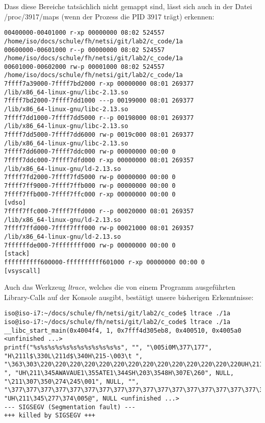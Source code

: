 \documentclass[a4paper,11pt,parskip=half]{scrartcl}
\begin{document}
Dass diese Bereiche tatsächlich nicht gemappt sind, lässt sich auch in der Datei /proc/3917/maps (wenn der Prozess die PID 3917 trägt) erkennen:
\begin{lstlisting}
00400000-00401000 r-xp 00000000 08:02 524557                             /home/iso/docs/schule/fh/netsi/git/lab2/c_code/1a
00600000-00601000 r--p 00000000 08:02 524557                             /home/iso/docs/schule/fh/netsi/git/lab2/c_code/1a
00601000-00602000 rw-p 00001000 08:02 524557                             /home/iso/docs/schule/fh/netsi/git/lab2/c_code/1a
7ffff7a39000-7ffff7bd2000 r-xp 00000000 08:01 269377                     /lib/x86_64-linux-gnu/libc-2.13.so
7ffff7bd2000-7ffff7dd1000 ---p 00199000 08:01 269377                     /lib/x86_64-linux-gnu/libc-2.13.so
7ffff7dd1000-7ffff7dd5000 r--p 00198000 08:01 269377                     /lib/x86_64-linux-gnu/libc-2.13.so
7ffff7dd5000-7ffff7dd6000 rw-p 0019c000 08:01 269377                     /lib/x86_64-linux-gnu/libc-2.13.so
7ffff7dd6000-7ffff7ddc000 rw-p 00000000 00:00 0 
7ffff7ddc000-7ffff7dfd000 r-xp 00000000 08:01 269357                     /lib/x86_64-linux-gnu/ld-2.13.so
7ffff7fd2000-7ffff7fd5000 rw-p 00000000 00:00 0 
7ffff7ff9000-7ffff7ffb000 rw-p 00000000 00:00 0 
7ffff7ffb000-7ffff7ffc000 r-xp 00000000 00:00 0                          [vdso]
7ffff7ffc000-7ffff7ffd000 r--p 00020000 08:01 269357                     /lib/x86_64-linux-gnu/ld-2.13.so
7ffff7ffd000-7ffff7fff000 rw-p 00021000 08:01 269357                     /lib/x86_64-linux-gnu/ld-2.13.so
7ffffffde000-7ffffffff000 rw-p 00000000 00:00 0                          [stack]
ffffffffff600000-ffffffffff601000 r-xp 00000000 00:00 0                  [vsyscall]
\end{lstlisting}

Auch das Werkzeug \emph{ltrace}, welches die von einem Programm ausgeführten Library-Calls auf der Konsole ausgibt, bestätigt unsere bisherigen Erkenntnisse:
\begin{lstlisting}
iso@iso-i7:~/docs/schule/fh/netsi/git/lab2/c_code$ ltrace ./1a
iso@iso-i7:~/docs/schule/fh/netsi/git/lab2/c_code$ ltrace ./1a
__libc_start_main(0x4004f4, 1, 0x7fff4d305eb8, 0x400510, 0x4005a0 <unfinished ...>
printf("%s%s%s%s%s%s%s%s%s%s%s%s", "", "\005i0M\377\177", "H\211l$\330L\211d$\340H\215-\003\t ", "\363\303\220\220\220\220\220\220\220\220\220\220\220\220\220\220UH\211\345SH\203\354\bH\213\005h\b ", "UH\211\345AWAVAUE1\355ATE1\344SH\203\3548H\307E\260", NULL, "\211\307\350\274\245\001", NULL, "", "\377\377\377\377\377\377\377\377\377\377\377\377\377\377\377\377\377\377"..., "UH\211\345\277\374\005@", NULL <unfinished ...>
--- SIGSEGV (Segmentation fault) ---
+++ killed by SIGSEGV +++
\end{lstlisting}
\end{document}
